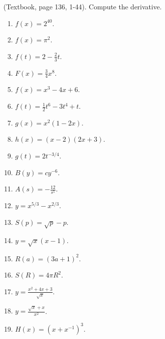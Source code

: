 \begin{problem} (Textbook, page 136, 1-44).
Compute the derivative.
\begin{multicols}{2}
\begin{enumerate}
\item $f(x)=2^{40}$.

\item $f(x)=\pi^2$.

\item $f(t)=2-\frac{2}{3}t$.

\item $F(x)=\frac{3}{4}x^8$.

\item $f(x)=x^3-4x+6$.

\item $f(t)=\frac{1}{2}t^6-3t^4+t$.

\item $g(x)=x^2(1-2x)$. 

\item $h(x)=(x-2)(2x+3)$.

\item $g(t)=2t^{-3/4}$.

\item $B(y)=c y^{-6}$.

\item $A(s)=-\frac{12}{s^5}$.

\item $y=x^{5/3}-x^{2/3}$.

\item $S(p)=\sqrt{p}-p$.

\item $y=\sqrt{x}(x-1)$.

\answer{$ $}
\item $R(a)=(3a+1)^2$.

\answer{$ $}
\item $S(R)=4\pi R^2$.

\answer{$ $}
\item $y=\frac{ x^2+4x+3}{\sqrt{x}}$.

\answer{$ $}
\item $y=\frac{\sqrt{x}+x}{x^2}$.

\answer{$ $}
\item $H(x)=(x+x^{-1})^3$.


\end{enumerate}
\end{multicols}
\end{problem}

